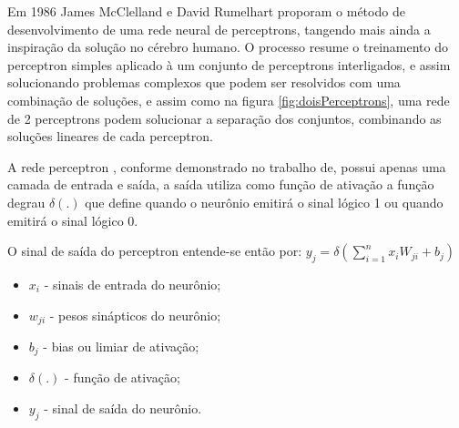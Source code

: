 	  	    Em 1986 James McClelland e David Rumelhart proporam o método de desenvolvimento de uma rede neural de perceptrons, tangendo mais ainda a inspiração da solução no cérebro humano. O processo resume o treinamento do perceptron simples aplicado à um conjunto de perceptrons interligados, e assim solucionando problemas complexos que podem ser resolvidos com uma combinação de soluções, e assim como na figura \ref{fig:doisPerceptrons}, uma rede de 2 perceptrons podem solucionar a separação dos conjuntos, combinando as soluções lineares de cada perceptron.
	  	  
  	  	  \begin{figure}[H]
  	  	   \end{figure}

            A rede perceptron , conforme demonstrado no trabalho de\cite{Flavia2014}, possui apenas uma camada de entrada e saída, a saída utiliza como função de ativação a função degrau $ \delta(.) $ que define quando o neurônio emitirá o sinal lógico 1 ou quando emitirá o sinal lógico 0.

            O sinal de saída do perceptron entende-se então por:
            $y_j= \delta(\sum_{i=1}^{n}x_i W_{ji}+b_j)$
            \begin{itemize}
            	\item $ x_i $ - sinais de entrada do neurônio;
            	\item $ w_{ji} $ - pesos sinápticos do neurônio;
            	\item $ b_j $ - bias ou limiar de ativação;
            	\item $ \delta(.) $ - função de ativação;
            	\item $ y_j $ - sinal de saída do neurônio.
            \end{itemize}
			
